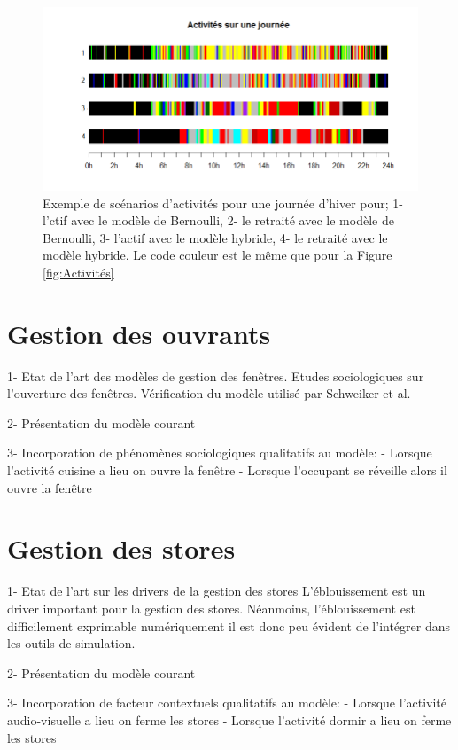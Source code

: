 \begin{figure}[H]
\centering
\includegraphics[scale=0.7]{Images/Activites/ActivitesSurUneJournee}
\caption{Exemple de scénarios d'activités pour une journée d'hiver pour; 1- l'ctif avec le modèle de Bernoulli, 2- le retraité avec le modèle de Bernoulli, 3- l'actif avec le modèle hybride, 4- le retraité avec le modèle hybride. Le code couleur est le même que pour la Figure \ref{fig:Activités}}
\label{fig:ExempleScenario}
\end{figure}

\section{Gestion des ouvrants}

1- Etat de l'art des modèles de gestion des fenêtres. Etudes sociologiques sur l'ouverture des fenêtres. Vérification du modèle utilisé par Schweiker et al. \cite{Schweiker-12}

2- Présentation du modèle courant 

3- Incorporation de phénomènes sociologiques qualitatifs au modèle:
    - Lorsque l'activité cuisine a lieu on ouvre la fenêtre
    - Lorsque l'occupant se réveille alors il ouvre la fenêtre
    
\section{Gestion des stores}

1- Etat de l'art sur les drivers de la gestion des stores
L'éblouissement est un driver important pour la gestion des stores. Néanmoins, l'éblouissement est difficilement exprimable numériquement il est donc peu évident de l'intégrer dans les outils de simulation.

2- Présentation du modèle courant

3- Incorporation de facteur contextuels qualitatifs au modèle:
	- Lorsque l'activité audio-visuelle a lieu on ferme les stores
	- Lorsque l'activité dormir a lieu on ferme les stores
	
